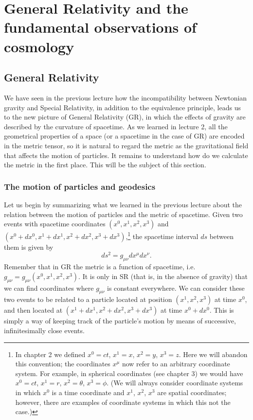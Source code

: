 \chapter{General Relativity and the fundamental observations of cosmology}

\section{General Relativity}

We have seen in the previous lecture how the incompatibility between Newtonian gravity and Special Relativity, in addition to the equivalence principle, leads us to the new picture of General Relativity (GR), in which the effects of gravity are described by the curvature of spacetime. As we learned in lecture 2, all the geometrical properties of a space (or a spacetime in the case of GR) are encoded in the metric tensor, so it is natural to regard the metric as the gravitational field that affects the motion of particles. It remains to understand how do we calculate the metric in the first place. This will be the subject of this section.

\subsection{The motion of particles and geodesics}

Let us begin by summarizing what we learned in the previous lecture about the relation between the motion of particles and the metric of spacetime. Given two events with spacetime coordinates $(x^0,x^1,x^2,x^3)$ and $(x^0+dx^0,x^1+dx^1,x^2+dx^2,x^3+dx^3)$,\footnote{In chapter 2 we defined $x^0=ct$, $x^1=x$, $x^2=y$, $x^3=z$. Here we will abandon this convention; the coordinates $x^{\mu}$ now refer to an arbitrary coordinate system. For example, in spherical coordinates (see chapter 3) we would have $x^0=ct$, $x^1=r$, $x^2=\theta$, $x^3=\phi$. (We will always consider coordinate systems in which $x^0$ is a time coordinate and $x^1$, $x^2$, $x^3$ are spatial coordinates; however, there are examples of coordinate systems in which this not the case.)} the spacetime interval $ds$ between them is given by
\begin{equation} \label{eq:line_element}
ds^2=g_{\mu\nu}dx^{\mu}dx^{\nu}.
\end{equation}
Remember that in GR the metric is a function of spacetime, i.e.\ $g_{\mu\nu}=g_{\mu\nu}(x^0,x^1,x^2,x^3)$. It is only in SR (that is, in the absence of gravity) that we can find coordinates where $g_{\mu\nu}$ is constant everywhere. We can consider these two events to be related to a particle located at position $(x^1,x^2,x^3)$ at time $x^0$, and then located at $(x^1+dx^1,x^2+dx^2,x^3+dx^3)$ at time $x^0+dx^0$. This is simply a way of keeping track of the particle's motion by means of successive, infinitesimally close events.

